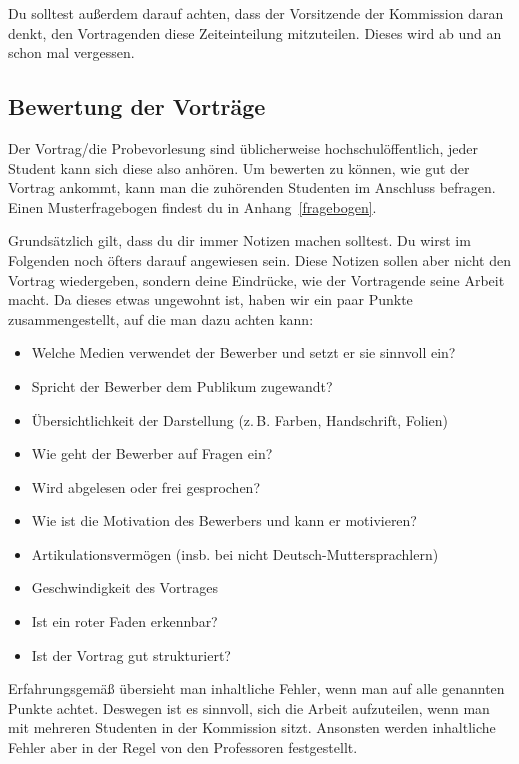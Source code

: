 \documentclass[10pt,twoside,a5paper,openright]{book}
\begin{document}
Du solltest außerdem darauf achten, dass der Vorsitzende der Kommission daran denkt, den Vortragenden diese Zeiteinteilung mitzuteilen. Dieses wird ab und an schon mal vergessen.

\subsection{Bewertung der Vorträge}
Der Vortrag/die Probevorlesung sind üblicherweise hochschulöffentlich, jeder Student kann sich
diese also anhören. Um bewerten zu können, wie gut der Vortrag ankommt, kann man die zuhörenden Studenten
im Anschluss befragen. Einen Musterfragebogen findest du in Anhang~\ref{fragebogen}.

Grundsätzlich gilt, dass du dir immer Notizen machen solltest. Du wirst im Folgenden noch öfters darauf angewiesen sein. Diese Notizen sollen aber nicht den Vortrag wiedergeben, sondern deine Eindrücke, wie der Vortragende seine Arbeit macht. Da dieses etwas ungewohnt ist, haben wir ein paar Punkte zusammengestellt, auf die man dazu achten kann:
\begin{itemize}
	\item Welche Medien verwendet der Bewerber und setzt er sie sinnvoll ein?
	\item Spricht der Bewerber dem Publikum zugewandt?
	\item Übersichtlichkeit der Darstellung (z.\,B. Farben, Handschrift, Folien)
	\item Wie geht der Bewerber auf Fragen ein?
	\item Wird abgelesen oder frei gesprochen?
	\item Wie ist die Motivation des Bewerbers und kann er motivieren?
	\item Artikulationsvermögen (insb. bei nicht Deutsch-Muttersprachlern)
	\item Geschwindigkeit des Vortrages
	\item Ist ein roter Faden erkennbar?
	\item Ist der Vortrag gut strukturiert?
\end{itemize}
Erfahrungsgemäß übersieht man inhaltliche Fehler, wenn man auf alle genannten Punkte achtet. Deswegen ist es sinnvoll, sich die Arbeit aufzuteilen, wenn man mit mehreren Studenten in der Kommission sitzt. Ansonsten werden inhaltliche Fehler aber in der Regel von den Professoren festgestellt.
\end{document}
